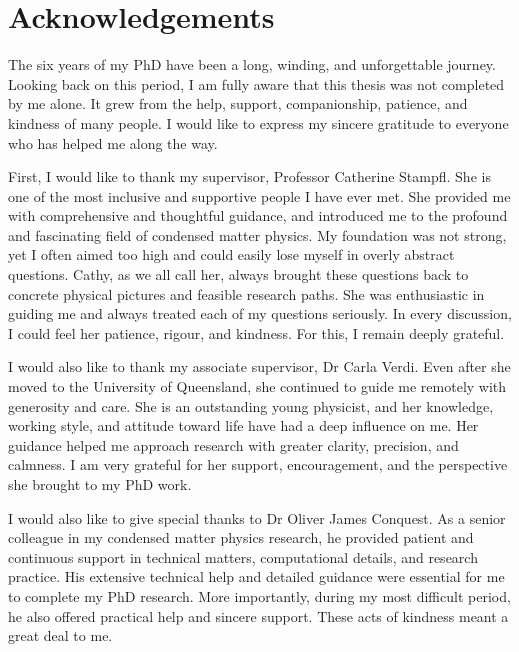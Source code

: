 \chapter*{Acknowledgements}

The six years of my PhD have been a long, winding, and unforgettable journey.
Looking back on this period, I am fully aware that this thesis was not completed by me alone.
It grew from the help, support, companionship, patience, and kindness of many people.
I would like to express my sincere gratitude to everyone who has helped me along the way.


First, I would like to thank my supervisor, Professor Catherine Stampfl.
She is one of the most inclusive and supportive people I have ever met.
She provided me with comprehensive and thoughtful guidance,
and introduced me to the profound and fascinating field of condensed matter physics.
My foundation was not strong, yet I often aimed too high and could easily lose myself in overly abstract questions.
Cathy, as we all call her, always brought these questions back to concrete physical pictures and feasible research paths.
She was enthusiastic in guiding me and always treated each of my questions seriously.
In every discussion, I could feel her patience, rigour, and kindness.
For this, I remain deeply grateful.

I would also like to thank my associate supervisor, Dr Carla Verdi.
Even after she moved to the University of Queensland,
she continued to guide me remotely with generosity and care.
She is an outstanding young physicist,
and her knowledge, working style, and attitude toward life have had a deep influence on me.
Her guidance helped me approach research with greater clarity, precision, and calmness.
I am very grateful for her support, encouragement, and the perspective she brought to my PhD work.

I would also like to give special thanks to Dr Oliver James Conquest.
As a senior colleague in my condensed matter physics research,
he provided patient and continuous support in technical matters, computational details, and research practice.
His extensive technical help and detailed guidance were essential for me to complete my PhD research.
More importantly, during my most difficult period,
he also offered practical help and sincere support.
These acts of kindness meant a great deal to me.


